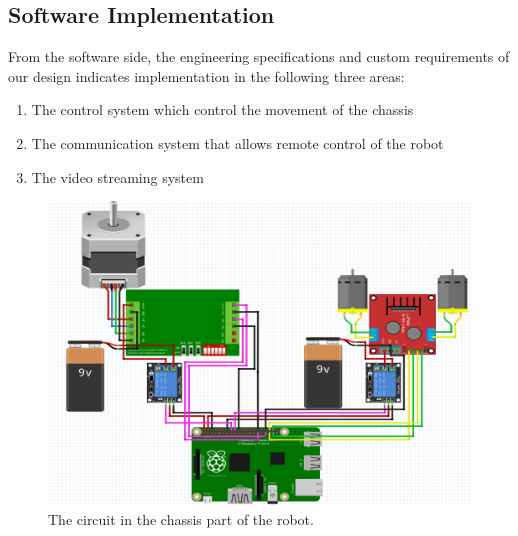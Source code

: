 \documentclass[12pt]{article}
\begin{document}
\subsection{Software Implementation}
From the software side, the engineering specifications and custom requirements of our design indicates implementation in the following three areas:
\begin{enumerate}
	\item The control system which control the movement of the chassis
	\item The communication system that allows remote control of the robot
	\item The video streaming system
\end{enumerate}
\begin{figure}[H]
	\centering
	\includegraphics[width=0.7\linewidth]{circuit}
	\caption{The circuit in the chassis part of the robot. }
	\label{fig:circuit}
\end{figure}
\end{document}
